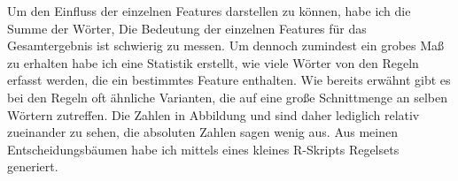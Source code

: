 \begin{figure}[h]
\begin{floatrow}
         {
            \caption{}
            \label{figure:j48_feature_influence_grouped}
        }
    \end{floatrow}
\end{figure}

Um den Einfluss der einzelnen Features darstellen zu können, habe ich die Summe der Wörter, 
Die Bedeutung der einzelnen Features für das Gesamtergebnis ist schwierig zu messen. Um dennoch zumindest ein grobes Maß zu erhalten habe ich eine Statistik erstellt, wie viele Wörter von den Regeln erfasst werden, die ein bestimmtes Feature enthalten. Wie bereits erwähnt gibt es bei den Regeln oft ähnliche Varianten, die auf eine große Schnittmenge an selben Wörtern zutreffen. Die Zahlen in Abbildung \label{figure:jrip_feature_influence_grouped} und \label{figure:j48_feature_influence_grouped} sind daher lediglich relativ zueinander zu sehen, die absoluten Zahlen sagen wenig aus. Aus meinen Entscheidungsbäumen habe ich mittels eines kleines R-Skripts Regelsets generiert.

